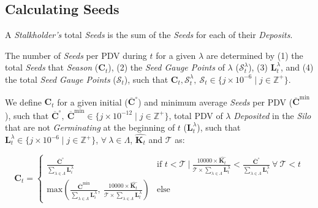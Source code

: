 \documentclass[tikz]{article}
\newcommand{\term}[1]{\textsl{#1}}
\begin{document}

\vspace*{-1mm}
\subsection{Calculating Seeds}
\vspace*{-1mm}

A \term{Stalkholder's} total \term{Seeds} is the sum of the \term{Seeds} for each of their \term{Deposits}.

The number of \term{Seeds} per PDV during $t$ for a given $\lambda$ are determined by (1) the total \term{Seeds} that \term{Season} ($\mathbf{C}_{t}$), (2) the \term{Seed Gauge Points} of $\lambda$ ($\mathscr{S}_{t}^{\lambda}$), (3) $\mathbf{L}_{t}^{\lambda}$, and (4) the total \term{Seed Gauge Points} ($\mathscr{S}_{t}$), such that $\mathbf{C}_{t}, \mathscr{S}_{t}^{\lambda},\ \mathscr{S}_{t} \in \{j \times 10^{-6} \mid j \in \mathbb{Z}^{+} \}$.

We define $\mathbf{C}_{t}$ for a given initial ($\overline{\mathbf{C}}^{\circ}$) and minimum average \term{Seeds} per PDV ($\overline{\mathbf{C}}^{\text{min}}$), such that $\overline{\mathbf{C}}^{\circ},\ \overline{\mathbf{C}}^{\text{min}} \in \{j \times 10^{-12} \mid j \in \mathbb{Z}^{+} \}$, total PDV of $\lambda$ \term{Deposited} in the \term{Silo} that are not \term{Germinating} at the beginning of $t$ ($\mathbf{L}_{t}^{\lambda}$), such that $\mathbf{L}_{t}^{\lambda} \in \{j \times 10^{-6} \mid j \in \mathbb{Z}^{+} \}$, $\forall\ \lambda \in \Lambda$, $\widehat{\mathbf{K}_{t}}$ and $\mathscr{T}$ as: 

    $$ 
        \mathbf{C}_{t} = 
        \begin{cases}
            \frac{\overline{\mathbf{C}}^{\circ}}
                {\sum\limits_{\lambda \in \Lambda}
                                            \mathbf{L}_{i}^{\lambda}}
                & \text{if } t < \mathscr{T}\ |\
                \frac{10000 \times \widehat{\mathbf{K}_{t}}}
                        {\mathscr{T} \times 
                            \sum\limits_{\lambda \in \Lambda}{\mathbf{L}_{t}^{\lambda}}}
                < \frac{\overline{\mathbf{C}}^{\circ}}
                    {\sum\limits_{\lambda \in \Lambda} 
                                                \mathbf{L}_{i}^{\lambda}}\ \forall\ \mathscr{T} < t \\
                
            \text{max}
            \left(\frac{\overline{\mathbf{C}}^{\text{min}}}
                    {\sum\limits_{\lambda \in \Lambda}
                                                \mathbf{L}_{i}^{\lambda}},\ 
            \frac{10000 \times \widehat{\mathbf{K}_{t}}}
                    {\mathscr{T} \times 
                        \sum\limits_{\lambda \in \Lambda}{\mathbf{L}_{t}^{\lambda}}}
            \right)
                & \text{else}
        \end{cases}
    $$
\end{document}
